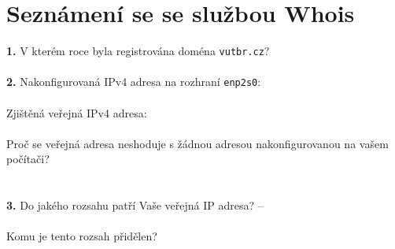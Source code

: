 \section{Seznámení se se službou Whois}
\textbf{1.} V kterém roce byla registrována doména {\tt vutbr.cz}?
\underline{\hspace{2cm}}
\\
\\
\textbf{2.} Nakonfigurovaná IPv4 adresa na rozhraní \texttt{enp2s0}: 
\underline{\hspace{3.8cm}}
\\
\\
\hspace*{0.5cm} Zjištěná veřejná IPv4 adresa: \underline{\hspace{3.8cm}}
\\
\\
\hspace*{0.5cm} Proč se veřejná adresa neshoduje s žádnou adresou nakonfigurovanou na vašem počítači?
\\
\\
\\
\textbf{3.} Do jakého rozsahu patří Vaše veřejná IP adresa?
\underline{\hspace{3.8cm}} -- \underline{\hspace{3.8cm}}
\\
\\
\hspace*{0.5cm}Komu je tento  rozsah přidělen?\hspace*{0.2cm}\underline{\hspace{3.8cm}}
\newpage
